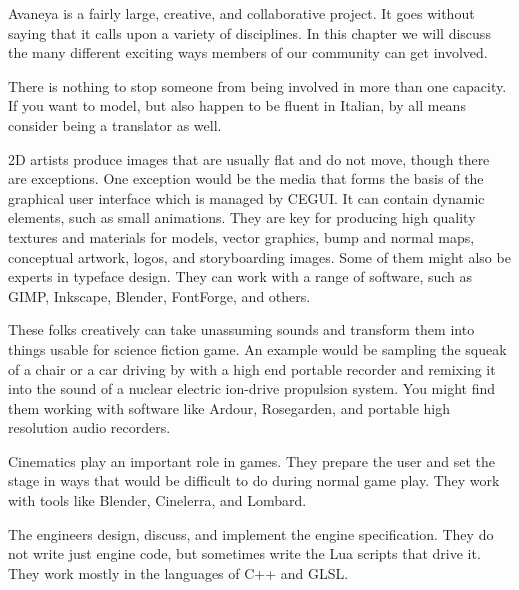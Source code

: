 

Avaneya is a fairly large, creative, and collaborative project. It goes without saying that it calls upon a variety of disciplines. In this chapter we will discuss the many different exciting ways members of our community can get involved.

There is nothing to stop someone from being involved in more than one capacity. If you want to model, but also happen to be fluent in Italian, by all means consider being a translator as well.


2D artists produce images that are usually flat and do not move, though there are exceptions. One exception would be the media that forms the basis of the graphical user interface which is managed by CEGUI. It can contain dynamic elements, such as small animations. They are key for producing high quality textures and materials for models, vector graphics, bump and normal maps, conceptual artwork, logos, and storyboarding images. Some of them might also be experts in typeface design. They can work with a range of software, such as GIMP, Inkscape, Blender, FontForge, and others.


These folks creatively can take unassuming sounds and transform them into things usable for science fiction game. An example would be sampling the squeak of a chair or a car driving by with a high end portable recorder and remixing it into the sound of a nuclear electric ion-drive propulsion system. You might find them working with software like Ardour, Rosegarden, and portable high resolution audio recorders.


Cinematics play an important role in games. They prepare the user and set the stage in ways that would be difficult to do during normal game play. They work with tools like Blender, Cinelerra, and Lombard.


The engineers design, discuss, and implement the engine specification. They do not write just engine code, but sometimes write the Lua scripts that drive it. They work mostly in the languages of C++ and GLSL. 

